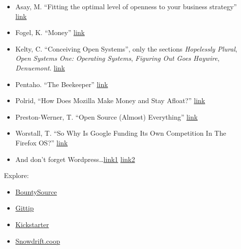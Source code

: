 \begin{itemize}
\itemsep1pt\parskip0pt
\item
  Asay, M. ``Fitting the optimal level of openness to your business
  strategy''
  \href{http://news.cnet.com/8301-13505_3-10244853-16.html}{link}
\item
  Fogel, K. ``Money'' \href{http://producingoss.com/en/money.html}{link}
\item
  Kelty, C. ``Conceiving Open Systems'', only the sections
  \emph{Hopelessly Plural}, \emph{Open Systems One: Operating Systems},
  \emph{Figuring Out Goes Haywire}, \emph{Denuemont}.
  \href{http://www.jus.uio.no/sisu/two_bits.christopher_kelty/5.html}{link}
\item
  Pentaho. ``The Beekeeper''
  \href{http://wiki.pentaho.com/display/BEEKEEPER/The+Beekeeper}{link}
\item
  Polrid, ``How Does Mozilla Make Money and Stay Afloat?''
  \href{http://www.technobuffalo.com/2010/01/01/how-does-the-mozilla-foundation-make-money/}{link}
\item
  Preston-Werner, T. ``Open Source (Almost) Everything''
  \href{http://tom.preston-werner.com/2011/11/22/open-source-everything.html}{link}
\item
  Worstall, T. ``So Why Is Google Funding Its Own Competition In The
  Firefox OS?''
  \href{http://www.forbes.com/sites/timworstall/2013/01/22/so-why-is-google-funding-its-own-competition-in-the-firefox-os/}{link}
\item
  And don't forget
  Wordpress\ldots{}\href{http://thenextweb.com/insider/2013/03/05/automattic-introduces-wordpress-com-business-a-new-pricing-tier-with-unlimited-themes-storage-and-customer-support/}{link1}
  \href{http://allthingsd.com/20120425/automattic-grows-up-the-company-behind-wordpress-com-shares-revenue-numbers-and-hires-execs/}{link2}
\end{itemize}

Explore:

\begin{itemize}
\itemsep1pt\parskip0pt
\item
  \href{https://www.bountysource.com/}{BountySource}
\item
  \href{https://www.gittip.com/}{Gittip}
\item
  \href{http://www.kickstarter.com/}{Kickstarter}
\item
  \href{https://snowdrift.coop/}{Snowdrift.coop}
\end{itemize}

